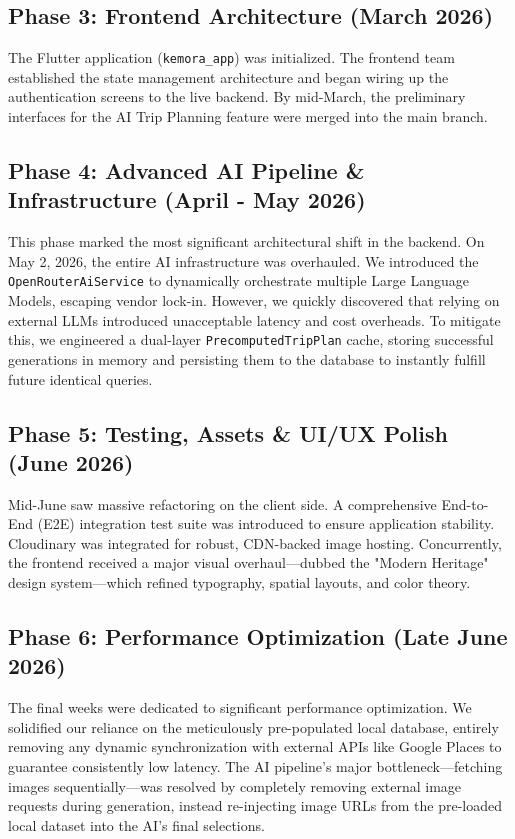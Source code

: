 \subsection{Phase 3: Frontend Architecture (March 2026)}
The Flutter application (\texttt{kemora\_app}) was initialized. The frontend team established the state management architecture and began wiring up the authentication screens to the live backend. By mid-March, the preliminary interfaces for the AI Trip Planning feature were merged into the main branch.

\subsection{Phase 4: Advanced AI Pipeline \& Infrastructure (April - May 2026)}
This phase marked the most significant architectural shift in the backend. On May 2, 2026, the entire AI infrastructure was overhauled. We introduced the \texttt{OpenRouterAiService} \cite{openrouter} to dynamically orchestrate multiple Large Language Models, escaping vendor lock-in. However, we quickly discovered that relying on external LLMs introduced unacceptable latency and cost overheads. To mitigate this, we engineered a dual-layer \texttt{PrecomputedTripPlan} cache, storing successful generations in memory and persisting them to the database to instantly fulfill future identical queries.

\subsection{Phase 5: Testing, Assets \& UI/UX Polish (June 2026)}
Mid-June saw massive refactoring on the client side. A comprehensive End-to-End (E2E) integration test suite was introduced to ensure application stability. Cloudinary was integrated for robust, CDN-backed image hosting. Concurrently, the frontend received a major visual overhaul—dubbed the "Modern Heritage" design system—which refined typography, spatial layouts, and color theory.

\subsection{Phase 6: Performance Optimization (Late June 2026)}
The final weeks were dedicated to significant performance optimization. We solidified our reliance on the meticulously pre-populated local database, entirely removing any dynamic synchronization with external APIs like Google Places to guarantee consistently low latency. The AI pipeline's major bottleneck—fetching images sequentially—was resolved by completely removing external image requests during generation, instead re-injecting image URLs from the pre-loaded local dataset into the AI's final selections.


